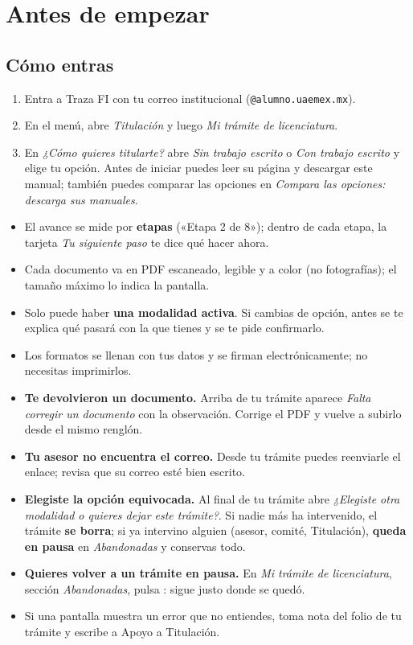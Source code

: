 \section{Antes de empezar}
\subsection*{Cómo entras}
\begin{enumerate}
  \item Entra a Traza FI con tu correo institucional (\texttt{@alumno.uaemex.mx}).
  \item En el menú, abre \emph{Titulación} y luego \emph{Mi trámite de licenciatura}.
  \item En \emph{¿Cómo quieres titularte?} abre \emph{Sin trabajo escrito} o \emph{Con trabajo escrito} y elige tu opción. Antes de iniciar puedes leer su página y descargar este manual; también puedes comparar las opciones en \emph{Compara las opciones: descarga sus manuales}.
\end{enumerate}
\begin{tencuenta}
\begin{itemize}
  \item El avance se mide por \textbf{etapas} («Etapa 2 de 8»); dentro de cada etapa, la tarjeta \emph{Tu siguiente paso} te dice qué hacer ahora.
  \item Cada documento va en PDF escaneado, legible y a color (no fotografías); el tamaño máximo lo indica la pantalla.
  \item Solo puede haber \textbf{una modalidad activa}. Si cambias de opción, antes se te explica qué pasará con la que tienes y se te pide confirmarlo.
  \item Los formatos se llenan con tus datos y se firman electrónicamente; no necesitas imprimirlos.
\end{itemize}
\end{tencuenta}
\begin{algosalemal}
\begin{itemize}
  \item \textbf{Te devolvieron un documento.} Arriba de tu trámite aparece \emph{Falta corregir un documento} con la observación. Corrige el PDF y vuelve a subirlo desde el mismo renglón.
  \item \textbf{Tu asesor no encuentra el correo.} Desde tu trámite puedes reenviarle el enlace; revisa que su correo esté bien escrito.
  \item \textbf{Elegiste la opción equivocada.} Al final de tu trámite abre \emph{¿Elegiste otra modalidad o quieres dejar este trámite?}. Si nadie más ha intervenido, el trámite \textbf{se borra}; si ya intervino alguien (asesor, comité, Titulación), \textbf{queda en pausa} en \emph{Abandonadas} y conservas todo.
  \item \textbf{Quieres volver a un trámite en pausa.} En \emph{Mi trámite de licenciatura}, sección \emph{Abandonadas}, pulsa : sigue justo donde se quedó.
  \item Si una pantalla muestra un error que no entiendes, toma nota del folio de tu trámite y escribe a Apoyo a Titulación.
\end{itemize}
\end{algosalemal}
